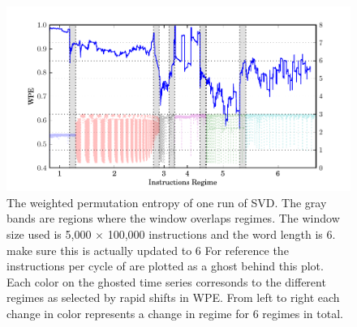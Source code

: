 \begin{figure}[htbp]
  \centering

    \includegraphics[width=\textwidth]{figs/SVD_wwpe}
  \caption{The weighted permutation entropy of one run of
  SVD. The gray bands are regions where the window overlaps
  regimes. The window size used is 5,000 $\times$ 100,000 instructions
  and the word length is $6$. {\color{red} make sure this is actually updated to 6} For reference the instructions per cycle
  of \svd are plotted as a ghost behind this plot. Each color on the
  ghosted time series corresonds to the different regimes as selected
  by rapid shifts in WPE. From left to right each change in color
  represents a change in regime for 6 regimes in
  total.}\label{fig:wwpe}
\end{figure}




